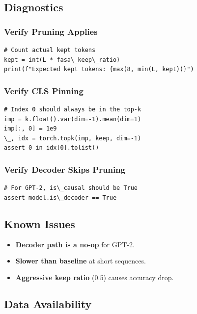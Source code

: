 \subsection{Diagnostics}

\subsubsection{Verify Pruning Applies}

\begin{lstlisting}
# Count actual kept tokens
kept = int(L * fasa\_keep\_ratio)
print(f"Expected kept tokens: {max(8, min(L, kept))}")
\end{lstlisting}

\subsubsection{Verify CLS Pinning}

\begin{lstlisting}
# Index 0 should always be in the top-k
imp = k.float().var(dim=-1).mean(dim=1)
imp[:, 0] = 1e9
\_, idx = torch.topk(imp, keep, dim=-1)
assert 0 in idx[0].tolist()
\end{lstlisting}

\subsubsection{Verify Decoder Skips Pruning}

\begin{lstlisting}
# For GPT-2, is\_causal should be True
assert model.is\_decoder == True
\end{lstlisting}

\subsection{Known Issues}

\begin{itemize}
\item \textbf{Decoder path is a no-op} for GPT-2.
\item \textbf{Slower than baseline} at short sequences.
\item \textbf{Aggressive keep ratio} (0.5) causes accuracy drop.

\end{itemize}
\subsection{Data Availability}

